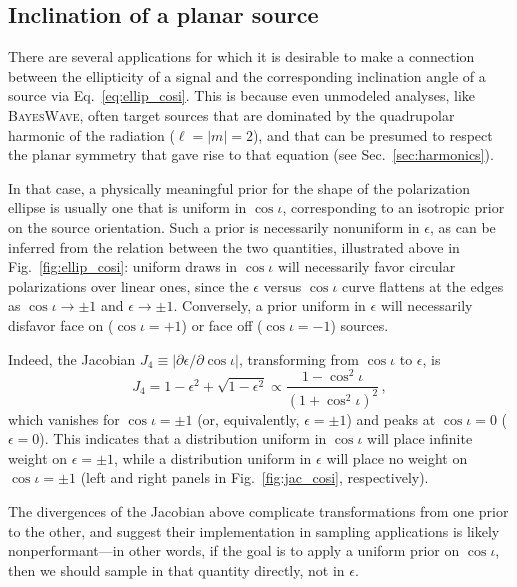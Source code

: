 \documentclass[aps,prd,twocolumn,superscriptaddress,preprintnumbers,floatfix,nofootinbib]{revtex4-2}
\newcommand*{\eq}[1]{Eq.~\eqref{eq:#1}}
\begin{document}
\subsection{Inclination of a planar source}
\label{sec:jac:cosi}

There are several applications for which it is desirable to make a connection between the ellipticity of a signal and the corresponding inclination angle of a source via \eq{ellip_cosi}.
This is because even unmodeled analyses, like \textsc{BayesWave}, often target sources that are dominated by the quadrupolar harmonic of the radiation ($\ell=|m|=2$), and that can be presumed to respect the planar symmetry that gave rise to that equation (see Sec.~\ref{sec:harmonics}).

In that case, a physically meaningful prior for the shape of the polarization ellipse is usually one that is uniform in $\cos\iota$, corresponding to an isotropic prior on the source orientation.
Such a prior is necessarily nonuniform in $\epsilon$, as can be inferred from the relation between the two quantities, illustrated above in Fig.~\ref{fig:ellip_cosi}: uniform draws in $\cos\iota$ will necessarily favor circular polarizations over linear ones, since the $\epsilon$ versus $\cos\iota$ curve flattens at the edges as $\cos\iota\to\pm 1$ and $\epsilon \to \pm 1$.
Conversely, a prior uniform in $\epsilon$ will necessarily disfavor face on ($\cos\iota=+1$) or face off ($\cos\iota=-1$) sources.

Indeed, the Jacobian $J_4 \equiv \left|\partial\epsilon/\partial \cos\iota\right|$, transforming from $\cos\iota$ to $\epsilon$, is
\begin{equation} \label{eq:jac_eps_cosi}
J_4 =1 - \epsilon^2 + \sqrt{1-\epsilon^2} 
\propto \frac{1 - \cos^2\iota}{\left(1+\cos^2\iota\right)^2} \, ,
\end{equation}
which vanishes for $\cos\iota = \pm 1$ (or, equivalently, $\epsilon = \pm 1$) and peaks at $\cos\iota = 0$ ($\epsilon= 0$).
This indicates that a distribution uniform in $\cos\iota$ will place infinite weight on $\epsilon = \pm 1$, while a distribution uniform in $\epsilon$ will place no weight on $\cos\iota = \pm 1$ (left and right panels in Fig.~\ref{fig:jac_cosi}, respectively).

The divergences of the Jacobian above complicate transformations from one prior to the other, and suggest their implementation in sampling applications is likely nonperformant---in other words, if the goal is to apply a uniform prior on $\cos\iota$, then we should sample in that quantity directly, not in $\epsilon$.
\end{document}
